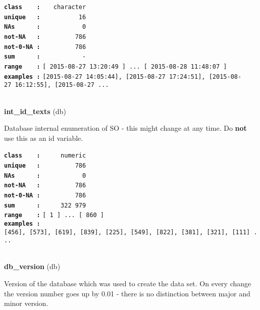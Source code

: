 \documentclass[]{article}
\begin{document}
\textbf{\texttt{class\ \ \ \ :}} \texttt{~~~character}\\
\textbf{\texttt{unique\ \ \ :}} \texttt{~~~~~~~~~~16}\\
\textbf{\texttt{NAs\ \ \ \ \ \ :}} \texttt{~~~~~~~~~~~0}\\
\textbf{\texttt{not-NA\ \ \ :}} \texttt{~~~~~~~~~786}\\
\textbf{\texttt{not-0-NA\ :}} \texttt{~~~~~~~~~786}\\
\textbf{\texttt{sum\ \ \ \ \ \ :}} \texttt{~~~~~~~~~~~-}\\
\textbf{\texttt{range\ \ \ \ :}}
\texttt{{[}\ 2015-08-27\ 13:20:49\ {]}\ ...\ {[}\ 2015-08-28\ 11:48:07\ {]}}\\
\textbf{\texttt{examples\ :}}
\texttt{{[}2015-08-27\ 14:05:44{]},\ {[}2015-08-27\ 17:24:51{]},\ {[}2015-08-27\ 16:12:55{]},\ {[}2015-08-27\ ...}\\

~

\textbf{int\_id\_texts} (db)

Database internal enumeration of SO - this might change at any time. Do
\textbf{not} use this as an id variable.

\textbf{\texttt{class\ \ \ \ :}} \texttt{~~~~~numeric}\\
\textbf{\texttt{unique\ \ \ :}} \texttt{~~~~~~~~~786}\\
\textbf{\texttt{NAs\ \ \ \ \ \ :}} \texttt{~~~~~~~~~~~0}\\
\textbf{\texttt{not-NA\ \ \ :}} \texttt{~~~~~~~~~786}\\
\textbf{\texttt{not-0-NA\ :}} \texttt{~~~~~~~~~786}\\
\textbf{\texttt{sum\ \ \ \ \ \ :}} \texttt{~~~~~322~979}\\
\textbf{\texttt{range\ \ \ \ :}}
\texttt{{[}\ 1\ {]}\ ...\ {[}\ 860\ {]}}\\
\textbf{\texttt{examples\ :}}
\texttt{{[}456{]},\ {[}573{]},\ {[}619{]},\ {[}839{]},\ {[}225{]},\ {[}549{]},\ {[}822{]},\ {[}381{]},\ {[}321{]},\ {[}111{]}\ ...}\\

~

\textbf{db\_version} (db)

Version of the database which was used to create the data set. On every
change the version number goes up by 0.01 - there is no distinction
between major and minor version.
\end{document}

